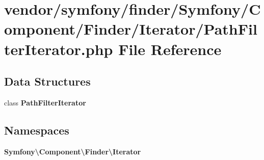 \section{vendor/symfony/finder/\+Symfony/\+Component/\+Finder/\+Iterator/\+Path\+Filter\+Iterator.php File Reference}
\label{_path_filter_iterator_8php}
\subsection*{Data Structures}
\begin{DoxyCompactItemize}
\item 
class {\bf Path\+Filter\+Iterator}
\end{DoxyCompactItemize}
\subsection*{Namespaces}
\begin{DoxyCompactItemize}
\item 
 {\bf Symfony\textbackslash{}\+Component\textbackslash{}\+Finder\textbackslash{}\+Iterator}
\end{DoxyCompactItemize}

